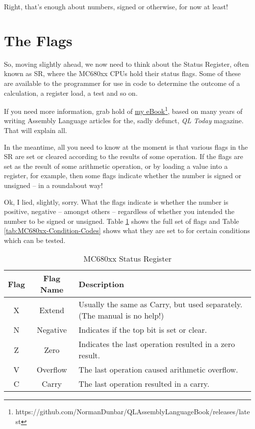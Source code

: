 Right, that's enough about numbers, signed or otherwise, for now at
least!

\section{The Flags}

So, moving slightly ahead, we now need to think about the Status Register,
often known as SR, where the MC680xx CPUs hold their status flags.
Some of these are available to the programmer for use in code to determine
the outcome of a calculation, a register load, a test and so on.

If you need more information, grab hold of \href{https://github.com/NormanDunbar/QLAssemblyLanguageBook/releases/latest}{my eBook}\footnote{https://github.com/NormanDunbar/QLAssemblyLanguageBook/releases/latest},
based on many years of writing Assembly Language articles for the,
sadly defunct, \emph{QL Today} magazine. That will explain all.

In the meantime, all you need to know at the moment is that various
flags in the SR are set or cleared according to the results of some
operation. If the flags are set as the result of some arithmetic operation,
or by loading a value into a register, for example, then some flags
indicate whether the number is signed or unsigned -- in a roundabout
way!

Ok, I lied, slightly, sorry. What the flags indicate is whether the
number is positive, negative -- amongst others -- regardless of
whether you intended the number to be signed or unsigned. Table \ref{tab:MC680xx-Status-Register}
shows the full set of flags and Table \ref{tab:MC680xx-Condition-Codes}
shows what they are set to for certain conditions which can be tested.

\begin{table}[!h]
\begin{centering}
\begin{tabular}{|c|c|>{\centering}p{}|}
\hline 
\textbf{Flag} & \textbf{Flag Name} & \textbf{Description}\tabularnewline
\hline 
\hline 
X & Extend & Usually the same as Carry, but used separately. (The manual is no
help!)\tabularnewline
\hline 
N & Negative & Indicates if the top bit is set or clear.\tabularnewline
\hline 
Z & Zero & Indicates the last operation resulted in a zero result.\tabularnewline
\hline 
V & Overflow & The last operation caused arithmetic overflow.\tabularnewline
\hline 
C & Carry & The last operation resulted in a carry.\tabularnewline
\hline 
\end{tabular}
\par\end{centering}
\caption{MC680xx Status Register\label{tab:MC680xx-Status-Register}}
\end{table}

